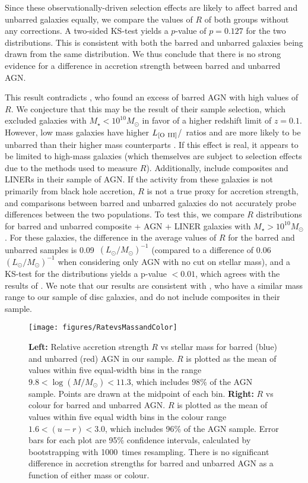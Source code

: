 Since these observationally-driven selection effects are likely to affect barred and unbarred galaxies equally, we compare the values of $R$ of both groups without any corrections. A two-sided KS-test yields a $p$-value of $p=0.127$ for the two distributions. This is consistent with both the barred and unbarred galaxies being drawn from the same distribution. We thus conclude that there is no strong evidence for a difference in accretion strength between barred and unbarred AGN.  

This result contradicts \citet{Alonso13}, who found an excess of barred AGN with high values of $R$. We conjecture that this may be the result of their sample selection, which excluded galaxies with $M_\star<10^{10}M_\odot$ in favor of a higher redshift limit of $z=0.1$. However, low mass galaxies have higher $L_{\rm{[O~III]}}$/\mbh~ratios and are more likely to be unbarred than their higher mass counterparts \citep{Lee12}. If this effect is real, it appears to be limited to high-mass galaxies (which themselves are subject to selection effects due to the methods used to measure $R$). Additionally, \citet{Alonso13} include composites and LINERs in their sample of AGN. If the activity from these galaxies is not primarily from black hole accretion, $R$ is not a true proxy for accretion strength, and comparisons between barred and unbarred galaxies do not accurately probe differences between the two populations. To test this, we compare $R$ distributions for barred and unbarred composite + AGN + LINER galaxies with $M_\star>10^{10}M_\odot$. For these galaxies, the difference in the average values of $R$ for the barred and unbarred samples is 0.09~$(L_\odot/M_\odot)^{-1}$ (compared to a difference of 0.06~$(L_\odot/M_\odot)^{-1}$ when considering only AGN with no cut on stellar mass), and a KS-test for the distributions yields a p-value $<0.01$, which agrees with the results of \citet{Alonso13}. We note that our results are consistent with \citet{Lee12}, who have a similar mass range to our sample of disc galaxies, and do not include composites in their sample.

\begin{figure*}
\texttt{[image: figures/RatevsMassandColor]}
\caption{\textbf{Left:} Relative accretion strength $R$ vs stellar mass for barred (blue) and unbarred (red) AGN in our sample. $R$ is plotted as the mean of values within five equal-width bins in the range $9.8<\log(M/M_{\odot})<11.3$, which includes 98\% of the AGN sample. Points are drawn at the midpoint of each bin. \textbf{Right:} $R$ vs colour for barred and unbarred AGN. $R$ is plotted as the mean of values within five equal width bins in the colour range $1.6<(u-r)<3.0$, which includes 96\% of the AGN sample. Error bars for each plot are 95\% confidence intervals, calculated by bootstrapping with 1000~times resampling. There is no significant difference in accretion strengths for barred and unbarred AGN as a function of either mass or colour.}
\label{Rate}
\end{figure*}

